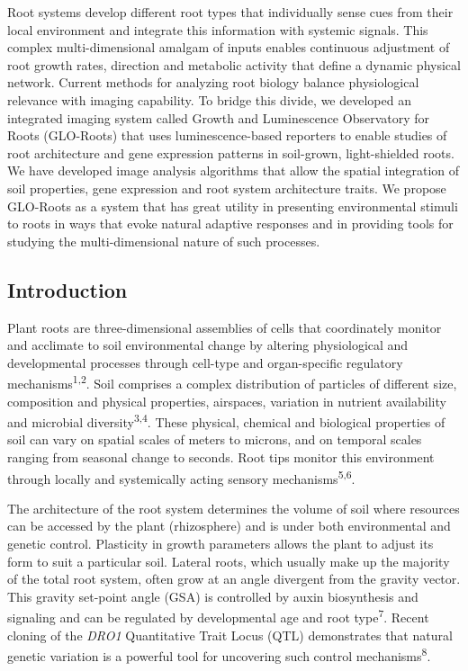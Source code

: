 \documentclass[]{article}
\begin{document}
Root systems develop different root types that individually sense cues
from their local environment and integrate this information with
systemic signals. This complex multi-dimensional amalgam of inputs
enables continuous adjustment of root growth rates, direction and
metabolic activity that define a dynamic physical network. Current
methods for analyzing root biology balance physiological relevance with
imaging capability. To bridge this divide, we developed an integrated
imaging system called Growth and Luminescence Observatory for Roots
(GLO-Roots) that uses luminescence-based reporters to enable studies of
root architecture and gene expression patterns in soil-grown,
light-shielded roots. We have developed image analysis algorithms that
allow the spatial integration of soil properties, gene expression and
root system architecture traits. We propose GLO-Roots as a system that
has great utility in presenting environmental stimuli to roots in ways
that evoke natural adaptive responses and in providing tools for
studying the multi-dimensional nature of such processes.

\subsection{Introduction}\label{introduction}

Plant roots are three-dimensional assemblies of cells that coordinately
monitor and acclimate to soil environmental change by altering
physiological and developmental processes through cell-type and
organ-specific regulatory mechanisms\textsuperscript{1,2}. Soil
comprises a complex distribution of particles of different size,
composition and physical properties, airspaces, variation in nutrient
availability and microbial diversity\textsuperscript{3,4}. These
physical, chemical and biological properties of soil can vary on spatial
scales of meters to microns, and on temporal scales ranging from
seasonal change to seconds. Root tips monitor this environment through
locally and systemically acting sensory mechanisms\textsuperscript{5,6}.

The architecture of the root system determines the volume of soil where
resources can be accessed by the plant (rhizosphere) and is under both
environmental and genetic control. Plasticity in growth parameters
allows the plant to adjust its form to suit a particular soil. Lateral
roots, which usually make up the majority of the total root system,
often grow at an angle divergent from the gravity vector. This gravity
set-point angle (GSA) is controlled by auxin biosynthesis and signaling
and can be regulated by developmental age and root
type\textsuperscript{7}. Recent cloning of the \emph{DRO1} Quantitative
Trait Locus (QTL) demonstrates that natural genetic variation is a
powerful tool for uncovering such control mechanisms\textsuperscript{8}.
\end{document}
